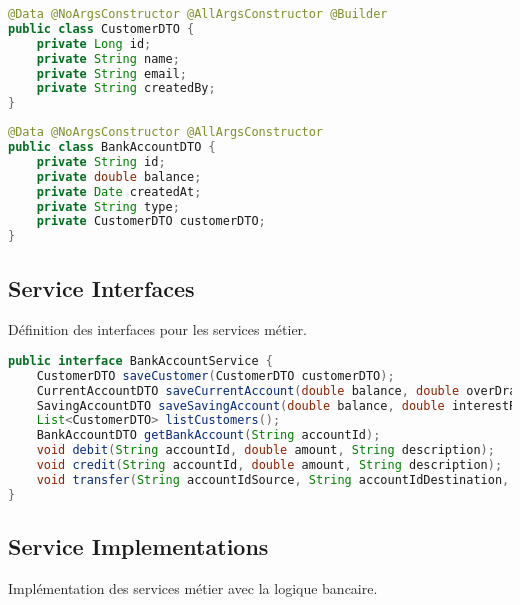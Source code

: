 \documentclass[12pt,a4paper]{report}
\begin{document}
\begin{lstlisting}[language=Java, caption=CustomerDTO.java]
@Data @NoArgsConstructor @AllArgsConstructor @Builder
public class CustomerDTO {
    private Long id;
    private String name;
    private String email;
    private String createdBy;
}
\end{lstlisting}

\begin{lstlisting}[language=Java, caption=BankAccountDTO.java]
@Data @NoArgsConstructor @AllArgsConstructor
public class BankAccountDTO {
    private String id;
    private double balance;
    private Date createdAt;
    private String type;
    private CustomerDTO customerDTO;
}
\end{lstlisting}

\subsection{Service Interfaces}
Définition des interfaces pour les services métier.

\begin{lstlisting}[language=Java, caption=BankAccountService.java]
public interface BankAccountService {
    CustomerDTO saveCustomer(CustomerDTO customerDTO);
    CurrentAccountDTO saveCurrentAccount(double balance, double overDraft, Long customerId);
    SavingAccountDTO saveSavingAccount(double balance, double interestRate, Long customerId);
    List<CustomerDTO> listCustomers();
    BankAccountDTO getBankAccount(String accountId);
    void debit(String accountId, double amount, String description);
    void credit(String accountId, double amount, String description);
    void transfer(String accountIdSource, String accountIdDestination, double amount);
}
\end{lstlisting}

\subsection{Service Implementations}
Implémentation des services métier avec la logique bancaire.
\end{document}
